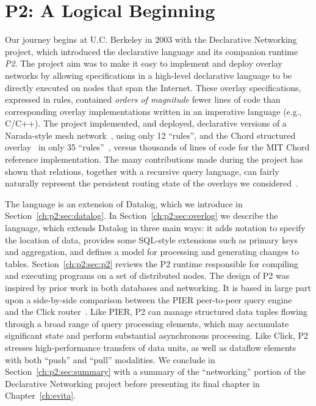 \chapter[P2: A Logical Beginning]{P2: A Logical Beginning}
\label{ch:p2}

Our journey begins at U.C.  Berkeley in $2003$ with the Declarative Networking
project, which introduced the declarative language {\em \OVERLOG} and its
companion runtime {\em P2}.  The project aim was to make it easy to implement
and deploy overlay networks by allowing specifications in a high-level
declarative language to be directly executed on nodes that span the Internet.
These overlay specifications, expressed in \OVERLOG rules, contained {\em
orders of magnitude} fewer lines of code than corresponding overlay
implementations written in an imperative language (e.g., C/C++).  The project
implemented, and deployed, declarative versions of a Narada-style mesh
network~\cite{chu00case}, using only 12 ``rules'', and the Chord structured
overlay~\cite{chord} in only 35 ``rules''~\cite{p2:sosp}, versus thousands of
lines of code for the MIT Chord reference implementation.  The many
contributions made during the project has shown that relations, together with a
recursive query language, can fairly naturally represent the persistent routing
state of the overlays we considered~\cite{loo-sigmod06, p2:sosp}.

The \OVERLOG language is an extension of Datalog, which we introduce in
Section~\ref{ch:p2:sec:datalog}.  In Section~\ref{ch:p2:sec:overlog} we
describe the \OVERLOG language, which extends Datalog in three main ways: it
adds notation to specify the location of data, provides some SQL-style
extensions such as primary keys and aggregation, and defines a model for
processing and generating changes to tables.  Section~\ref{ch:p2:sec:p2}
reviews the P2 runtime responsible for compiling and executing \OVERLOG
programs on a set of distributed nodes.  The design of P2 was inspired by prior
work in both databases and networking.  It is based in large part upon a
side-by-side comparison between the PIER peer-to-peer query
engine~\cite{pier-cidr05} and the Click router~\cite{click-tocs}.  Like PIER,
P2 can manage structured data tuples flowing through a broad range of query
processing elements, which may accumulate significant state and perform
substantial asynchronous processing.  Like Click, P2 stresses high-performance
transfers of data units, as well as dataflow elements with both ``push'' and
``pull'' modalities.  We conclude in Section~\ref{ch:p2:sec:summary} with a
summary of the ``networking'' portion of the Declarative Networking project
before presenting its final chapter in Chapter~\ref{ch:evita}.

